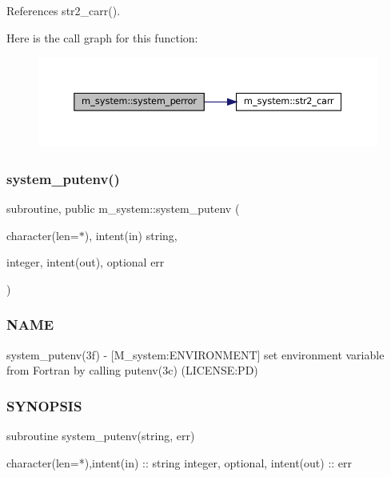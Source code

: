 References str2\+\_\+carr().

Here is the call graph for this function\+:\nopagebreak
\begin{figure}[H]
\begin{center}
\leavevmode
\includegraphics[width=350pt]{namespacem__system_afae451a1fc5432274dc1f75a364051b4_cgraph}
\end{center}
\end{figure}
\mbox{\label{namespacem__system_af0c9df8e59cac9cd617cd1e20448ea7d}} 
\subsubsection{\texorpdfstring{system\+\_\+putenv()}{system\_putenv()}}
{\footnotesize\ttfamily subroutine, public m\+\_\+system\+::system\+\_\+putenv (\begin{DoxyParamCaption}\item[{character(len=$\ast$), intent(in)}]{string,  }\item[{integer, intent(out), optional}]{err }\end{DoxyParamCaption})}



\subsubsection*{N\+A\+ME}

system\+\_\+putenv(3f) -\/ \mbox{[}M\+\_\+system\+:E\+N\+V\+I\+R\+O\+N\+M\+E\+NT\mbox{]} set environment variable from Fortran by calling putenv(3c) (L\+I\+C\+E\+N\+SE\+:PD) 

\subsubsection*{S\+Y\+N\+O\+P\+S\+IS}

\begin{DoxyVerb}subroutine system_putenv(string, err)

 character(len=*),intent(in)    :: string
 integer, optional, intent(out) :: err
\end{DoxyVerb}


